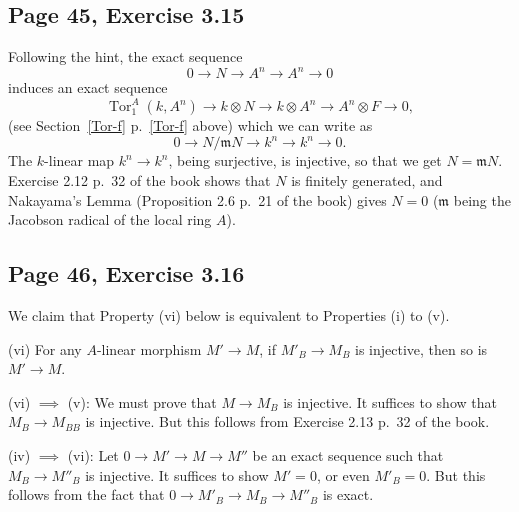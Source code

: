 \documentclass[parskip=half,fontsize=12pt]{scrartcl}%
\newcommand{\mf}{\mathfrak}
\newcommand{\mmm}{\mf m}
\newcommand{\Tor}{\operatorname{Tor}}
\begin{document}
\subsection{Page 45, Exercise 3.15}%

Following the hint, the exact sequence 
$$
0\to N\to A^n\to A^n\to0
$$ 
induces an exact sequence 
$$
\Tor^A_1(k,A^n)\to k\otimes N\to k\otimes A^n\to A^n\otimes F\to0,
$$ 
(see Section~\ref{Tor-f} p.~\ref{Tor-f} above) which we can write as 
$$
0\to N/\mmm N\to k^n\to k^n\to0.%
$$ 
The $k$-linear map $k^n\to k^n$, being surjective, is injective, so that we get $N=\mmm N$. Exercise 2.12 p.~32 of the book shows that $N$ is finitely generated, and Nakayama’s Lemma (Proposition 2.6 p.~21 of the book) gives $N=0$ ($\mmm$ being the Jacobson radical of the local ring $A$). 

%
\begin{comment}
We follow Jeffrey Daniel Kasik Carlson. 

The exact sequence 
$$
0\to N\to F\to F\to0
$$ 
in the hint of the book induces an exact sequence 
$$
k\otimes N\to k\otimes F\to k\otimes F\to0,
$$ 
which we can write as 
$$
N/\mmm N\to k^n\to k^n\to0.
$$ 
Now Exercise 2.12 p.~32 of the book shows that $N$ is finitely generated. %
The map $k^n\to k^n$ is a surjection of vector spaces of the same dimension, hence an isomorphism. This implies $N=\mmm N$, and Nakayama’s Lemma (Proposition 2.6 p.~21 of the book) gives $N=0$ ($\mmm$ being the Jacobson radical of the local ring $A$). Thus our endomorphism of $F$ is injective. 
\end{comment}
%

\subsection{Page 46, Exercise 3.16}\label{316}%

We claim that Property (vi) below is equivalent to Properties (i) to (v).

(vi) For any $A$-linear morphism $M'\to M$, if $M'_B\to M_B$ is injective, then so is $M'\to M$.

(vi) $\implies$ (v): We must prove that $M\to M_B$ is injective. It suffices to show that $M_B\to M_{BB}$ is injective. But this follows from Exercise 2.13 p.~32 of the book.

(iv) $\implies$ (vi): Let $0\to M'\to M\to M''$ be an exact sequence such that $M_B\to M''_B$ is injective. It suffices to show $M'=0$, or even $M'_B=0$. But this follows from the fact that $0\to M'_B\to M_B\to M''_B$ is exact.
\end{document}
